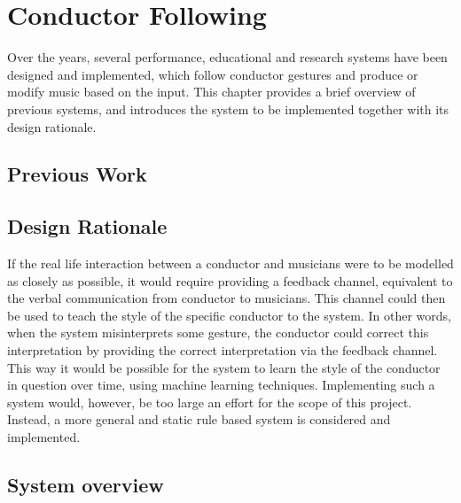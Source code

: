 
\chapter{Conductor Following}
\label{chapter:conductor_following}

Over the years, several performance, educational and research systems
have been designed and implemented,
which follow conductor gestures and produce or modify music based on the input.
This chapter provides a brief overview of previous systems,
and introduces the system to be implemented together with its design rationale.


\section{Previous Work}

\section{Design Rationale}

If the real life interaction between a conductor and musicians
were to be modelled as closely as possible,
it would require providing a feedback channel,
equivalent to the verbal communication from conductor to musicians.
This channel could then be used to teach the
style of the specific conductor to the system.
In other words, when the system misinterprets some gesture,
the conductor could correct this interpretation by 
providing the correct interpretation via the feedback channel.
This way it would be possible for the system to
learn the style of the conductor in question over time,
using machine learning techniques.
Implementing such a system would, however,
be too large an effort for the scope of this project.
Instead, a more general and static rule based system is
considered and implemented.


\section{System overview}

